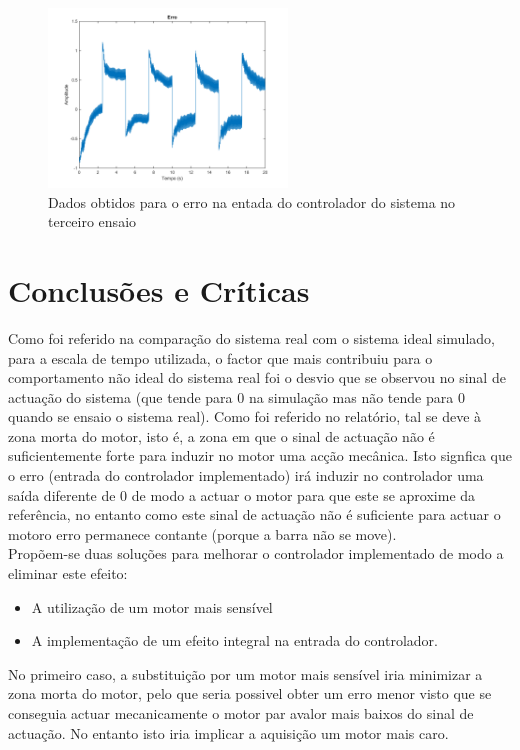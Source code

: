 \documentclass[%
  reprint,
  nofootinbib,
  amsmath,amssymb,
  aps,
  10pt,
  a4paper
]{revtex4-1}
\begin{document}
\begin{figure}[H]
\includegraphics[width=2.5in]{../imgs/dados_00_g/dados_00_g_err.png}
\caption{Dados obtidos para o erro na entada do controlador do sistema no terceiro ensaio}
\label{fig:erro}
\end{figure}
\label{s:conclu}
\section{Conclusões e Críticas}
Como foi referido na comparação do sistema real com o sistema ideal simulado, para a escala de tempo utilizada, o factor que mais contribuiu para o comportamento não ideal do sistema real foi o desvio que se observou no sinal de actuação do sistema (que tende para 0 na simulação mas não tende para 0 quando se ensaio o sistema real). Como foi referido no relatório, tal se deve à zona morta do motor, isto é, a zona em que o sinal de actuação não é suficientemente forte para induzir no motor uma acção mecânica. Isto signfica que o erro (entrada do controlador implementado) irá induzir no controlador uma saída diferente de 0 de modo a actuar o motor para que este se aproxime da referência, no entanto como este sinal de actuação não é suficiente para actuar o motoro erro permanece contante (porque a barra não se move).\\
Propõem-se duas soluções para melhorar o controlador implementado de modo a eliminar este efeito:
\begin{itemize}
\item A utilização de um motor mais sensível
\item A implementação de um efeito integral na entrada do controlador.
\end{itemize}
No primeiro caso, a substituição por um motor mais sensível iria minimizar a zona morta do motor, pelo que seria possivel obter um erro menor visto que se conseguia actuar mecanicamente o motor par avalor mais baixos do sinal de actuação. No entanto isto iria implicar a aquisição um motor mais caro.\\
\end{document}
